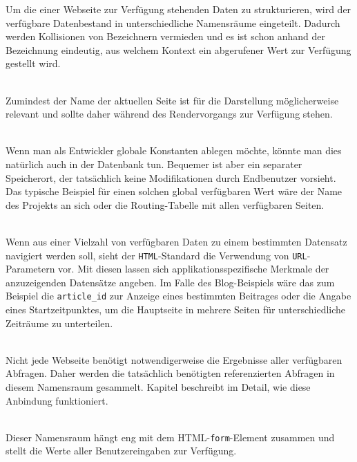 Um die einer Webseite zur Verfügung stehenden Daten zu strukturieren, wird der verfügbare Datenbestand in unterschiedliche Namensräume eingeteilt. Dadurch werden Kollisionen von Bezeichnern vermieden und es ist schon anhand der Bezeichnung eindeutig, aus welchem Kontext ein abgerufener Wert zur Verfügung gestellt wird.

\begin{description}[noitemsep]
\item[\texttt{page} für Eigenschaften der Seite] \hfill \\
  Zumindest der Name der aktuellen Seite ist für die Darstellung möglicherweise relevant und sollte daher während des Rendervorgangs zur Verfügung stehen.
\item[\texttt{project} für Eigenschaften des Projektes] \hfill \\
  Wenn man als Entwickler globale Konstanten ablegen möchte, könnte man dies natürlich auch in der Datenbank tun. Bequemer ist aber ein separater Speicherort, der tatsächlich keine Modifikationen durch Endbenutzer vorsieht. Das typische Beispiel für einen solchen global verfügbaren Wert wäre der Name des Projekts an sich oder die Routing-Tabelle mit allen verfügbaren Seiten.
\item[\texttt{get} für \texttt{URL}-Parameter] \hfill \\
  Wenn aus einer Vielzahl von verfügbaren Daten zu einem bestimmten Datensatz navigiert werden soll, sieht der \texttt{HTML}-Standard die Verwendung von \texttt{URL}-Parametern vor. Mit diesen lassen sich applikationsspezifische Merkmale der anzuzeigenden Datensätze angeben. Im Falle des Blog-Beispiels wäre das zum Beispiel die \texttt{article\_id} zur Anzeige eines bestimmten Beitrages oder die Angabe eines Startzeitpunktes, um die Hauptseite in mehrere Seiten für unterschiedliche Zeiträume zu unterteilen.
\item[\texttt{query} für \texttt{SELECT}-Abfragen] \hfill \\
  Nicht jede Webseite benötigt notwendigerweise die Ergebnisse aller verfügbaren Abfragen. Daher werden die tatsächlich benötigten referenzierten Abfragen in diesem Namensraum gesammelt. Kapitel  beschreibt im Detail, wie diese Anbindung funktioniert.
\item[\texttt{input} für Benutzereingaben] \hfill \\
  Dieser Namensraum hängt eng mit dem HTML-\texttt{form}-Element zusammen und stellt die Werte aller Benutzereingaben zur Verfügung.
\end{description}

